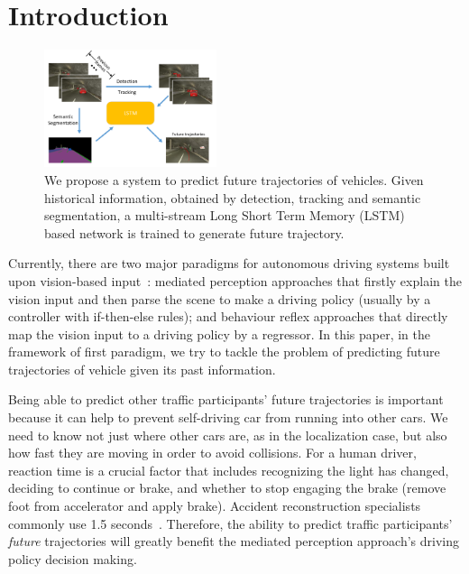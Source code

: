 \documentclass[10pt,twocolumn,letterpaper]{article}
\begin{document}
\section{Introduction}
\begin{figure}[t]
        \centering
        \includegraphics[width=0.45\textwidth]{figures/pull_figure.pdf}
        \caption{ {
        We propose a system to predict future trajectories of vehicles. Given historical information, obtained by detection, tracking and semantic segmentation, a multi-stream Long Short Term Memory (LSTM)  based network is trained to generate future trajectory.}}
        \label{fig:pull_figure}
\end{figure}

Currently, there are two major paradigms for autonomous driving systems built upon vision-based input~\cite{chen2015deepdriving}: mediated perception approaches that firstly explain the vision input and then parse the scene to make a driving policy (usually by a controller with if-then-else rules); and behaviour reflex approaches that directly map the vision input to a driving policy by a regressor.
In this paper, in the framework of first paradigm, we try to tackle the problem of predicting future trajectories of vehicle given its past information.


 Being able to predict other traffic participants' future trajectories is important because it can help to prevent self-driving car from running into other cars. We need to know not just where other cars are, as in the localization case, but also how fast they are moving in order to avoid collisions.
For a human driver, reaction time is a crucial factor that includes recognizing the light has changed, deciding to continue or brake, and whether to stop engaging the brake (remove foot from accelerator and apply brake). Accident reconstruction specialists commonly use 1.5 seconds~\cite{mcgehee2000driver}.
Therefore, the ability to predict traffic participants' \emph{future} trajectories will greatly benefit the mediated perception approach's driving policy decision making.
\end{document}
